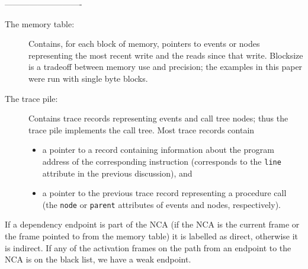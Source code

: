 ----------------------------


\begin{description}
\item[The memory table:]
Contains, for each block of memory, pointers to events or nodes representing
the most recent write and the reads since that write. 
Blocksize is a tradeoff between memory use and precision; the examples in 
this paper were run with single byte blocks. 
\item[The trace pile:]
Contains trace records representing events and call tree nodes; thus the 
trace pile implements the call tree. Most trace records contain 
\begin{itemize}
\item
a pointer to a record containing information about the program 
address of the corresponding instruction (corresponds to the {\tt line} 
attribute in the previous discussion), and
\item
a pointer to the previous trace record representing a procedure call (the 
{\tt node} or {\tt parent} attributes of events and nodes, respectively).
\end{itemize}
\end{description}

If a dependency endpoint is part of the NCA (if the NCA is the current
frame or the frame pointed to from the memory table) it is labelled as
direct, otherwise it is indirect. If any of the activation frames on
the path from an endpoint to the NCA is on the black list, we have a
weak endpoint.


